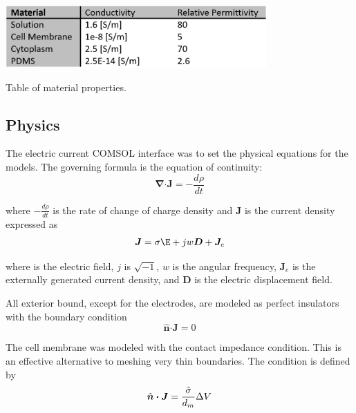 \begin{table}[h]
    \centering
    \includegraphics[width=0.75\textwidth]{images/materialpropertiestable.png}
    \caption{Table of material properties.}
    \label{tab:fea_materials}
\end{table}

\subsection*{Physics}
\par The electric current COMSOL interface was to set the physical equations for the models. The governing formula is the equation of continuity:
\begin{equation}
    \boldsymbol\nabla \boldsymbol\cdot \boldsymbol J = -\frac{d\rho}{dt}
\end{equation}

where $-\frac{d\rho}{dt}$ is the rate of change of charge density and $\boldsymbol J$ is the current density expressed as
\begin{equation}
    \boldsymbol J = \sigma\boldsymbol\E + jw\boldsymbol D + \boldsymbol J_e
\end{equation}

where \boldsymbol\E is the electric field, $j$ is $\sqrt{-1}$, $w$ is the angular frequency, $\boldsymbol J_e$ is the externally generated current density, and $\boldsymbol D$ is the electric displacement field. 

\par All exterior bound, except for the electrodes, are modeled as perfect insulators with the boundary condition
\begin{equation}
    \hat{\boldsymbol n} \boldsymbol\cdot \boldsymbol J = 0
\end{equation}

\par The cell membrane was modeled with the contact impedance condition. This is an effective alternative to meshing very thin boundaries. The condition is defined by
\begin{equation}
    \hat{\boldsymbol n} \boldsymbol\cdot \boldsymbol J = \frac{\Tilde{\sigma}}{d_{m}} \Delta V
\end{equation}

